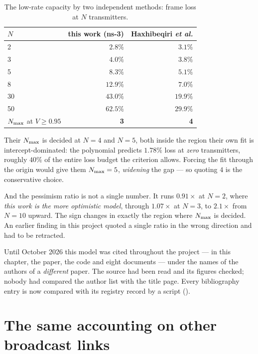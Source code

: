 \begin{table}[h]
\centering
\caption{The low-rate capacity by two independent methods: frame loss at $N$ transmitters.}
\label{tab:lora-external}
\begin{tabular}{lrr}
\toprule
$N$ & this work (ns-3) & Haxhibeqiri \emph{et al.} \\
\midrule
2  & $2.8\%$ & $3.1\%$ \\
3  & $4.0\%$ & $3.8\%$ \\
5  & $8.3\%$ & $5.1\%$ \\
8  & $12.9\%$ & $7.0\%$ \\
30 & $43.0\%$ & $19.9\%$ \\
50 & $62.5\%$ & $29.9\%$ \\
\midrule
$N_{\max}$ at $V \geq 0.95$ & \textbf{3} & \textbf{4} \\
\bottomrule
\end{tabular}
\end{table}

\begin{remark}
Their $N_{\max}$ is decided at $N = 4$ and $N = 5$, both inside the region their own fit is
intercept-dominated: the polynomial predicts $1.78\%$ loss at \emph{zero} transmitters, roughly
$40\%$ of the entire loss budget the criterion allows. Forcing the fit through the origin would give
them $N_{\max} = 5$, \emph{widening} the gap --- so quoting $4$ is the conservative choice.

And the pessimism ratio is not a single number. It runs $0.91\times$ at $N = 2$, where \emph{this
work is the more optimistic model}, through $1.07\times$ at $N = 3$, to $2.1\times$ from $N = 10$
upward. The sign changes in exactly the region where $N_{\max}$ is decided. An earlier finding in this
project quoted a single ratio in the wrong direction and had to be retracted.
\end{remark}

\begin{remark}
Until October 2026 this model was cited throughout the project --- in this chapter, the paper,
the code and eight documents --- under the names of the authors of a \emph{different} paper. The
source had been read and its figures checked; nobody had compared the author list with the title
page. Every bibliography entry is now compared with its registry record by a script
().
\end{remark}

\section{The same accounting on other broadcast links}\label{sec:other-links}

